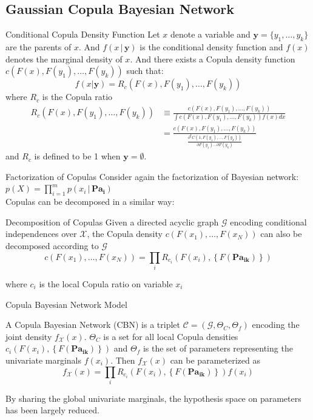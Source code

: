 \subsection{Gaussian Copula Bayesian Network}
\begin{frame}{Conditional Copula Density Function}
Let $x$ denote a variable and $\mathbf{y}=\{y_1,\dots ,y_k\}$ are the parents of $x$. And $f(x\,|\,\mathbf{y})$ is the conditional density function and $f(x)$ denotes the marginal density of $x$. And there exists a Copula density function $c(F(x),F(y_1),\dots ,F(y_k))$ such that: 
\[
f(x|\mathbf{y})=R_c(F(x),F(y_1),\dots , F(y_k))
\]
where $R_c$ is the Copula ratio
\begin{align*}
R_c(F(x),F(y_1),\dots , F(y_k))& \equiv \frac{c(F(x),F(y_1),\dots , F(y_k))}{\int c(F(x),F(y_1),\dots , F(y_k))f(x)dx}\nonumber\\
& =\frac{c(F(x),F(y_1),\dots , F(y_k))}{\frac{\partial^kC(1,F(y_1),\dots ,F(y_k))}{\partial F(y_1)\dots \partial F(y_k)}}
\end{align*}
and $R_c$ is defined to be 1 when $\mathbf{y}=\emptyset$. 
\end{frame}
\begin{frame}{Factorization of Copulas}
Consider again the factorization of Bayesian network: $p\left( X\right) = \prod^m_{i=1}p(x_i\,|\,\mathbf{Pa_i})$\\
Copulas can be decomposed in a similar way: 
\begin{block}{Decomposition of Copulas}
Given a directed acyclic graph $\mathcal{G}$ encoding conditional independences over $\mathcal{X}$, the Copula density $c\left(F\left(x_1\right),\ldots, F\left(x_N\right)\right)$ can also be decomposed according to $\mathcal{G}$
\[
c\left(F\left(x_1\right),\ldots, F\left(x_N\right)\right) = \prod_i R_{c_i}(F(x_i),\left\lbrace F(\mathbf{Pa_{ik}})\right\rbrace) 
\]
\end{block}
where $c_i$ is the local Copula ratio on variable $x_i$
\end{frame}
\begin{frame}{Copula Bayesian Network Model}
\begin{definition}
A Copula Bayesian Network (CBN) is a triplet $\mathcal{C}=(\mathcal{G}, \Theta_C, \Theta_f)$ encoding the joint density $f_\mathcal{X}(x)$. $\Theta_C$ is a set for all local Copula densities $c_i(F(x_i),\left\lbrace F(\mathbf{Pa_{ik}})\right\rbrace)$ and $\Theta_f$ is the set of parameters representing the univariate marginals $f(x_i)$. Then $f_\mathcal{X}(x)$ can be parameterized as
\[
f_\mathcal{X}(x)=\prod_i R_{c_i}(F(x_i),\left\lbrace F(\mathbf{Pa_{ik}})\right\rbrace)f(x_i)
\]
\end{definition}
By sharing the global univariate marginals, the hypothesis space on parameters has been largely reduced.
\end{frame}
